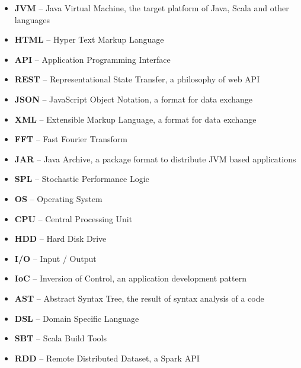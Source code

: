 \documentclass[12pt,a4paper]{report}
\begin{document}



\tableofcontents














\listoffigures

\listoftables


\begin{itemize}
	\item \textbf{JVM} -- Java Virtual Machine, the target platform of Java, Scala and other languages
	\item \textbf{HTML} -- Hyper Text Markup Language
	\item \textbf{API} -- Application Programming Interface
	\item \textbf{REST} -- Representational State Transfer, a philosophy of web API
	\item \textbf{JSON} -- JavaScript Object Notation, a format for data exchange
	\item \textbf{XML} -- Extensible Markup Language, a format for data exchange
	\item \textbf{FFT} -- Fast Fourier Transform
	\item \textbf{JAR} -- Java Archive, a package format to distribute JVM based applications
	\item \textbf{SPL} -- Stochastic Performance Logic
	\item \textbf{OS} -- Operating System
	\item \textbf{CPU} -- Central Processing Unit
	\item \textbf{HDD} -- Hard Disk Drive
	\item \textbf{I/O} -- Input / Output
	\item \textbf{IoC} -- Inversion of Control, an application development pattern
	\item \textbf{AST} -- Abstract Syntax Tree, the result of syntax analysis of a code
	\item \textbf{DSL} -- Domain Specific Language
	\item \textbf{SBT} -- Scala Build Tools
	\item \textbf{RDD} -- Remote Distributed Dataset, a Spark API
\end{itemize}
\end{document}
